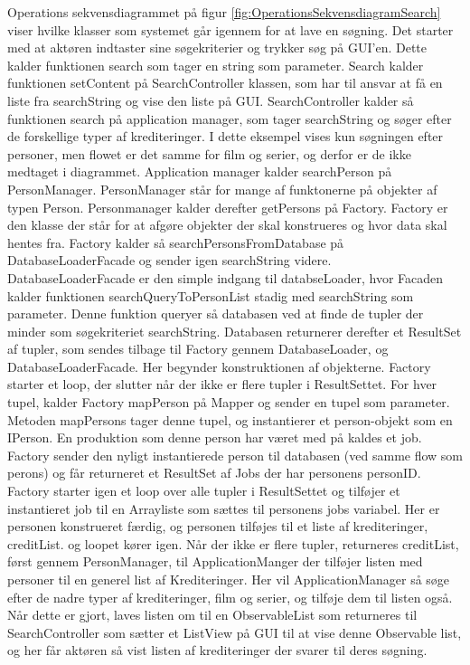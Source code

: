 Operations sekvensdiagrammet på figur \ref{fig:OperationsSekvensdiagramSearch} viser hvilke klasser som systemet går igennem for at lave en søgning. Det starter med at aktøren indtaster sine søgekriterier og trykker søg på GUI'en. Dette kalder funktionen search som tager en string som parameter. Search kalder funktionen setContent på SearchController klassen, som har til ansvar at få en liste fra searchString og vise den liste på GUI. SearchController kalder så funktionen search på application manager, som tager searchString og søger efter de forskellige typer af krediteringer. I dette eksempel vises kun søgningen efter personer, men flowet er det samme for film og serier, og derfor er de ikke medtaget i diagrammet. Application manager kalder searchPerson på PersonManager. PersonManager står for mange af funktonerne på objekter af typen Person. Personmanager kalder derefter getPersons på Factory. Factory er den klasse der står for at afgøre objekter der skal konstrueres og hvor data skal hentes fra. Factory kalder så searchPersonsFromDatabase på DatabaseLoaderFacade og sender igen searchString videre. DatabaseLoaderFacade er den simple indgang til databseLoader, hvor Facaden kalder funktionen searchQueryToPersonList stadig med searchString som parameter. Denne funktion queryer så databasen ved at finde de tupler der minder som søgekriteriet searchString. Databasen returnerer derefter et ResultSet af tupler, som sendes tilbage til Factory gennem DatabaseLoader, og DatabaseLoaderFacade. Her begynder konstruktionen af objekterne. Factory starter et loop, der slutter når der ikke er flere tupler i ResultSettet. For hver tupel, kalder Factory mapPerson på Mapper og sender en tupel som parameter. Metoden mapPersons tager denne tupel, og instantierer et person-objekt som en IPerson. En produktion som denne person har været med på kaldes et job. Factory sender den nyligt instantierede person til databasen (ved samme flow som perons) og får returneret et ResultSet af Jobs der har personens personID. Factory starter igen et loop over alle tupler i ResultSettet og tilføjer et instantieret job til en Arrayliste som sættes til personens jobs variabel. Her er personen konstrueret færdig, og personen tilføjes til et liste af krediteringer, creditList. og loopet kører igen. Når der ikke er flere tupler, returneres creditList, først gennem PersonManager, til ApplicationManger der tilføjer listen med personer til en generel list af Krediteringer. Her vil ApplicationManager så søge efter de nadre typer af krediteringer, film og serier, og tilføje dem til listen også. Når dette er gjort, laves listen om til en ObservableList som returneres til SearchController som sætter et ListView på GUI til at vise denne Observable list, og her får aktøren så vist listen af krediteringer der svarer til deres søgning.